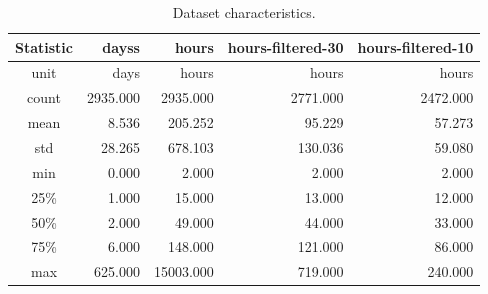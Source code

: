 \documentclass[conference,compsoc]{IEEEtran}
\begin{document}
\begin{table}[!t]
	\centering
	\begin{tabular}{c|r|r|r|r}
	Statistic &  dayss & hours & hours-filtered-30 &  hours-filtered-10 \\
	\hline
	unit & days & hours & hours & hours \\
	count &  2935.000 &   2935.000 & 2771.000 & 2472.000 \\
	mean  &     8.536 &    205.252 &   95.229 &   57.273 \\
	std   &    28.265 &    678.103 &  130.036 &   59.080 \\
	min   &     0.000 &      2.000 &    2.000 &    2.000 \\
	25\%   &     1.000 &     15.000 &   13.000 &   12.000 \\
	50\%   &     2.000 &     49.000 &   44.000 &   33.000 \\
	75\%   &     6.000 &    148.000 &  121.000 &   86.000 \\
	max   &   625.000 &  15003.000 &  719.000 &  240.000 \\
	\end{tabular}
	\renewcommand{\arraystretch}{1.3}
	\caption{Dataset characteristics. }
	\label{dataset_description}
\end{table}
\end{document}
